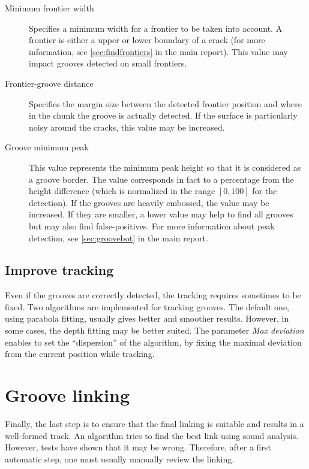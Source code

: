 \begin{description}
\item[Minimum frontier width] Specifies a minimum width for a frontier to be taken into account. A frontier is either a upper or lower boundary of a crack (for more information, see \autoref{sec:findfrontiers} in the main report). This value may impact grooves detected on small frontiers.
\item[Frontier-groove distance] Specifies the margin size between the detected frontier position and where in the chunk the groove is actually detected. If the surface is particularly noisy around the cracks, this value may be increased.
\item[Groove minimum peak] This value represents the minimum peak height so that it is considered as a groove border. The value corresponds in fact to a percentage from the height difference (which is normalized in the range $[0,100]$ for the detection). If the grooves are heavily embossed, the value may be increased. If they are smaller, a lower value may help to find all grooves but may also find false-positives. For more information about peak detection, see \autoref{sec:groovebot} in the main report.
\end{description}

\subsection{Improve tracking}

Even if the grooves are correctly detected, the tracking requires sometimes to be fixed. Two algorithms are implemented for tracking grooves. The default one, using parabola fitting, usually gives better and smoother results. However, in some cases, the depth fitting may be better suited. The parameter \emph{Max deviation} enables to set the ``dispersion'' of the algorithm, by fixing the maximal deviation from the current position while tracking.

\section{Groove linking}

Finally, the last step is to ensure that the final linking is suitable and results in a well-formed track. An algorithm tries to find the best link using sound analysis. However, tests have shown that it may be wrong. Therefore, after a first automatic step, one must usually manually review the linking.

